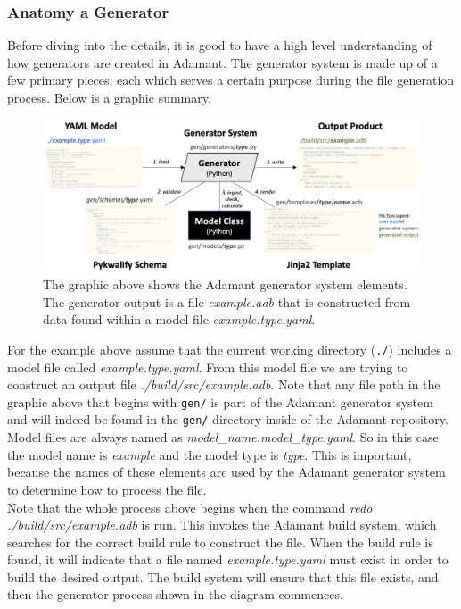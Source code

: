 \subsubsection{Anatomy a Generator} \label{Adding Generators}

Before diving into the details, it is good to have a high level understanding of how generators are created in Adamant. The generator system is made up of a few primary pieces, each which serves a certain purpose during the file generation process. Below is a graphic summary.

\begin{figure}[H]
  \includegraphics[width=1.0\textwidth,center]{images/generators.png}
  \caption{The graphic above shows the Adamant generator system elements. The generator output is a file \textit{example.adb} that is constructed from data found within a model file \textit{example.type.yaml}.}
\end{figure}

For the example above assume that the current working directory (\texttt{./}) includes a model file called \textit{example.type.yaml}. From this model file we are trying to construct an output file \textit{./build/src/example.adb}. Note that any file path in the graphic above that begins with \texttt{gen/} is part of the Adamant generator system and will indeed be found in the \texttt{gen/} directory inside of the Adamant repository. \\

Model files are always named as \textit{model\_name.model\_type.yaml}. So in this case the model name is \textit{example} and the model type is \textit{type}. This is important, because the names of these elements are used by the Adamant generator system to determine how to process the file. \\

Note that the whole process above begins when the command \textit{redo ./build/src/example.adb} is run. This invokes the Adamant build system, which searches for the correct build rule to construct the file. When the build rule is found, it will indicate that a file named \textit{example.type.yaml} must exist in order to build the desired output. The build system will ensure that this file exists, and then the generator process shown in the diagram commences. \\

